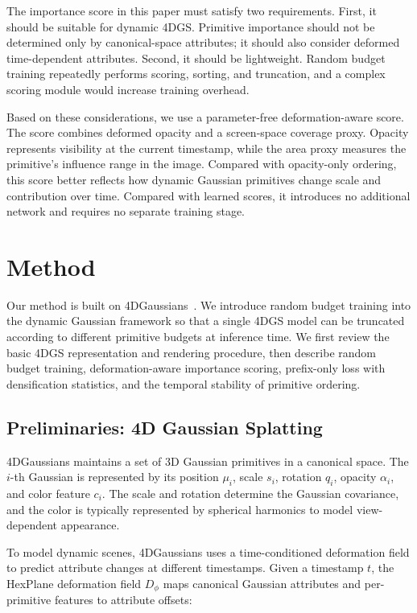 \documentclass[pdflatex,sn-mathphys]{sn-jnl}
\begin{document}
The importance score in this paper must satisfy two requirements. First, it should be suitable for dynamic 4DGS. Primitive importance should not be determined only by canonical-space attributes; it should also consider deformed time-dependent attributes. Second, it should be lightweight. Random budget training repeatedly performs scoring, sorting, and truncation, and a complex scoring module would increase training overhead.

Based on these considerations, we use a parameter-free deformation-aware score. The score combines deformed opacity and a screen-space coverage proxy. Opacity represents visibility at the current timestamp, while the area proxy measures the primitive's influence range in the image. Compared with opacity-only ordering, this score better reflects how dynamic Gaussian primitives change scale and contribution over time. Compared with learned scores, it introduces no additional network and requires no separate training stage.

\section{Method}
\label{sec:method}

Our method is built on 4DGaussians~\cite{wu20244dgaussians}. We introduce random budget training into the dynamic Gaussian framework so that a single 4DGS model can be truncated according to different primitive budgets at inference time. We first review the basic 4DGS representation and rendering procedure, then describe random budget training, deformation-aware importance scoring, prefix-only loss with densification statistics, and the temporal stability of primitive ordering.

\subsection{Preliminaries: 4D Gaussian Splatting}
\label{sec:prelim}

4DGaussians maintains a set of 3D Gaussian primitives in a canonical space. The $i$-th Gaussian is represented by its position $\mu_i$, scale $s_i$, rotation $q_i$, opacity $\alpha_i$, and color feature $c_i$. The scale and rotation determine the Gaussian covariance, and the color is typically represented by spherical harmonics to model view-dependent appearance.

To model dynamic scenes, 4DGaussians uses a time-conditioned deformation field to predict attribute changes at different timestamps. Given a timestamp $t$, the HexPlane deformation field $D_\phi$ maps canonical Gaussian attributes and per-primitive features to attribute offsets:
\end{document}
